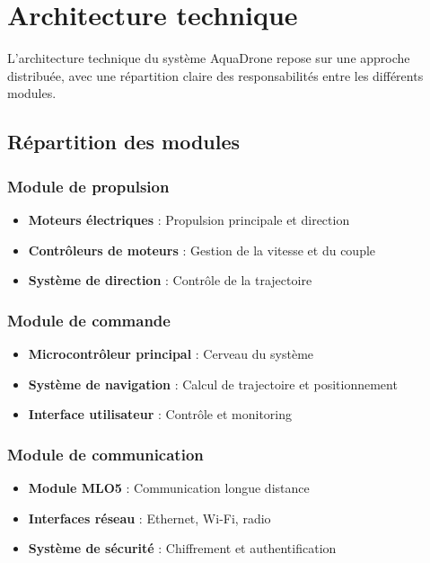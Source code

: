 {\section{Architecture technique}
L'architecture technique du système AquaDrone repose sur une approche distribuée, avec une répartition claire des responsabilités entre les différents modules.

\subsection{Répartition des modules}
\subsubsection{Module de propulsion}
\begin{itemize}
    \item \textbf{Moteurs électriques} : Propulsion principale et direction
    \item \textbf{Contrôleurs de moteurs} : Gestion de la vitesse et du couple
    \item \textbf{Système de direction} : Contrôle de la trajectoire
\end{itemize}

\subsubsection{Module de commande}
\begin{itemize}
    \item \textbf{Microcontrôleur principal} : Cerveau du système
    \item \textbf{Système de navigation} : Calcul de trajectoire et positionnement
    \item \textbf{Interface utilisateur} : Contrôle et monitoring
\end{itemize}

\subsubsection{Module de communication}
\begin{itemize}
    \item \textbf{Module MLO5} : Communication longue distance
    \item \textbf{Interfaces réseau} : Ethernet, Wi-Fi, radio
    \item \textbf{Système de sécurité} : Chiffrement et authentification
\end{itemize}

}
